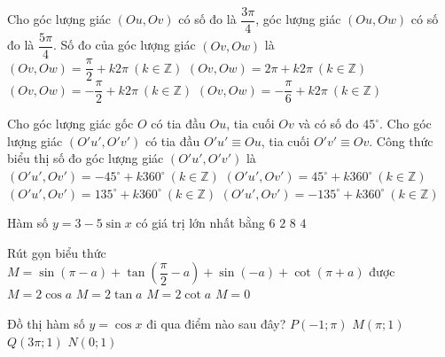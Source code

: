 \begin{ex}%
	Cho góc lượng giác $(Ou,Ov)$ có số đo là $\dfrac{3\pi}{4}$, góc lượng giác $(Ou,Ow)$ có số đo là $\dfrac{5\pi}{4}$. Số đo của góc lượng giác $(Ov,Ow)$ là
	\choice
	{\True $(Ov,Ow)=\dfrac{\pi}{2}+k2\pi\ (k\in \mathbb{Z})$}
	{$(Ov,Ow)=2\pi+k2\pi\ (k\in \mathbb{Z})$}
	{$(Ov,Ow)=-\dfrac{\pi}{2}+k2\pi\ (k\in \mathbb{Z})$}
	{$(Ov,Ow)=-\dfrac{\pi}{6}+k2\pi\ (k\in \mathbb{Z})$}
\end{ex}

\begin{ex}%
	Cho góc lượng giác gốc $O$ có tia đầu $Ou$, tia cuối $Ov$ và có số đo $45^\circ$. Cho góc lượng giác $(O'u',O'v')$ có tia đầu $O'u'\equiv Ou$, tia cuối $O'v'\equiv Ov$. Công thức biểu thị số đo góc lượng giác $(O'u',O'v')$ là
	\choice
	{$(O'u',Ov')=-45^\circ+k360^\circ\ (k\in \mathbb{Z})$}
	{\True $(O'u',Ov')=45^\circ+k360^\circ\ (k\in \mathbb{Z})$}
	{$(O'u',Ov')=135^\circ+k360^\circ\ (k\in \mathbb{Z})$}
	{$(O'u',Ov')=-135^\circ+k360^\circ\ (k\in \mathbb{Z})$}
\end{ex}

\begin{ex}%
	Hàm số $y=3-5\sin x$ có giá trị lớn nhất bằng
	\choice
	{$6$}
	{$2$}
	{\True $8$}
	{$4$}
\end{ex}

\begin{ex}%
	Rút gọn biểu thức $M=\sin(\pi-a)+\tan\left(\dfrac{\pi}{2}-a\right)+\sin(-a)+\cot(\pi+a)$ được
	\choice
	{$M=2\cos a$}
	{$M=2\tan a$}
	{\True $M=2\cot a$}
	{$M=0$}
\end{ex}

\begin{ex}%
	Đồ thị hàm số $y=\cos x$ đi qua điểm nào sau đây?
	\choice
	{$P(-1;\pi)$}
	{$M(\pi;1)$}
	{$Q(3\pi; 1)$}
	{\True $N(0;1)$}
\end{ex}

